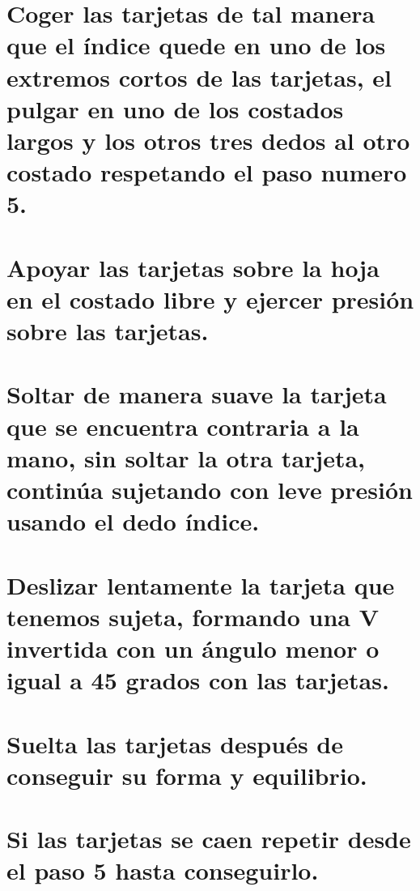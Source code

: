 \documentclass{article}
\begin{document}
\section{Coger las tarjetas de tal manera que el índice quede en uno de los extremos cortos de las tarjetas, el pulgar en uno de los costados largos y los otros tres dedos al otro costado respetando el paso numero 5.}

\section{ Apoyar las tarjetas sobre la hoja en el costado libre y ejercer presión sobre las tarjetas. }

\section{Soltar de manera suave la tarjeta que se encuentra contraria a la mano, sin soltar la otra tarjeta, continúa sujetando con leve presión usando el dedo índice.}

\section{Deslizar lentamente la tarjeta que tenemos sujeta, formando una V invertida con un ángulo menor o igual a 45 grados con las tarjetas.}

\section{Suelta las tarjetas después de conseguir su forma y equilibrio.}

\section{Si las tarjetas se caen repetir desde el paso 5 hasta conseguirlo.}
\end{document}
